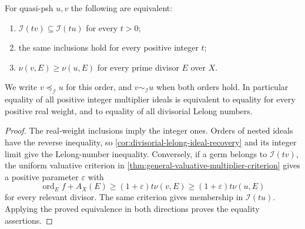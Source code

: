 \begin{proposition}\label{prop:multiplier-singularity-order}
For quasi-psh $u,v$ the following are equivalent:
\begin{enumerate}
 \item $\mathcal I(tv)\subseteq\mathcal I(tu)$ for every $t>0$;
 \item the same inclusions hold for every positive integer $t$;
 \item $\nu(v,E)\geq\nu(u,E)$ for every prime divisor $E$ over $X$.
\end{enumerate}
We write $v\preceq_{\mathcal I}u$ for this order, and $v\sim_{\mathcal I}u$ when both orders hold. In particular equality of all positive integer multiplier ideals is equivalent to equality for every positive real weight, and to equality of all divisorial Lelong numbers.
\end{proposition}
\begin{proof}
The real-weight inclusions imply the integer ones. Orders of nested ideals have the reverse inequality, so \cref{cor:divisorial-lelong-ideal-recovery} and its integer limit give the Lelong-number inequality. Conversely, if a germ belongs to $\mathcal I(tv)$, the uniform valuative criterion in \cref{thm:general-valuative-multiplier-criterion} gives a positive parameter $\varepsilon$ with
\[
 \operatorname{ord}_E f+A_X(E)
       \geq(1+\varepsilon)t\nu(v,E)
       \geq(1+\varepsilon)t\nu(u,E)
\]
for every relevant divisor. The same criterion gives membership in $\mathcal I(tu)$. Applying the proved equivalence in both directions proves the equality assertions.
\end{proof}

